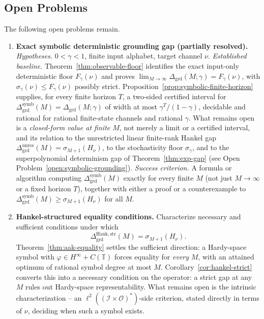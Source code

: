 \documentclass[12pt]{article}
\theoremstyle{definition}
\newcommand{\Dunres}{\Delta_{\mathrm{grd}}^{\mathrm{unres}}}
\newcommand{\DHankstr}{\Delta_{\mathrm{grd}}^{\mathrm{Hank,str}}}
\begin{document}
\subsection{Open Problems}
\label{subsec:open-problems}

The following open problems remain.

\begin{enumerate}[leftmargin=2.0em]
\item \textbf{Exact symbolic deterministic grounding gap (partially resolved).}
\emph{Hypotheses.} $0<\gamma<1$, finite input alphabet, target channel $\nu$.
\emph{Established baseline.} Theorem~\ref{thm:observable-floor} identifies
the exact input-only deterministic floor $F_\gamma(\nu)$ and proves
$\lim_{M\to\infty}\Delta_{\mathrm{grd}}(M;\gamma)=F_\gamma(\nu)$, with
$\sigma_\gamma(\nu)\le F_\gamma(\nu)$ possibly strict.
Proposition~\ref{prop:symbolic-finite-horizon} supplies, for every finite
horizon $T$, a two-sided certified interval for
$\Delta_{\mathrm{grd}}^{\mathrm{symb}}(M)=\Delta_{\mathrm{grd}}(M;\gamma)$ of
width at most $\gamma^T/(1-\gamma)$, decidable and rational for rational
finite-state channels and rational $\gamma$.  What remains open is a
\emph{closed-form value at finite $M$}, not merely a limit or a certified
interval, and its relation to the unrestricted linear finite-rank Hankel gap
$\Dunres(M)=\sigma_{M+1}(H_\nu)$, to the stochasticity floor $\sigma_\gamma$,
and to the superpolynomial determinism gap of
Theorem~\ref{thm:exp-gap} (see Open Problem~\ref{open:symbolic-grounding}).
\emph{Success criterion.} A formula or algorithm computing
$\Delta_{\mathrm{grd}}^{\mathrm{symb}}(M)$ exactly for every finite $M$ (not
just $M\to\infty$ or a fixed horizon $T$), together with either a proof or a
counterexample to $\Delta_{\mathrm{grd}}^{\mathrm{symb}}(M)\ge\sigma_{M+1}(H_\nu)$
for all $M$.

\item \textbf{Hankel-structured equality conditions.}
Characterize necessary and sufficient conditions under which
\[
\DHankstr(M)
=
\sigma_{M+1}(H_\nu).
\]
Theorem~\ref{thm:aak-equality} settles the sufficient direction: a Hardy-space
symbol with $\varphi\in H^\infty+C(\mathbb T)$ forces equality for
\emph{every} $M$, with an attained optimum of rational symbol degree at most
$M$.  Corollary~\ref{cor:hankel-strict} converts this into a necessary
condition on the operator: a strict gap at any $M$ rules out Hardy-space
representability.  What remains open is the intrinsic characterization -- an
$\ell^2((\mathcal I\times\mathcal O)^*)$-side criterion, stated directly in
terms of $\nu$, deciding when such a symbol exists.


\end{enumerate}
\end{document}
